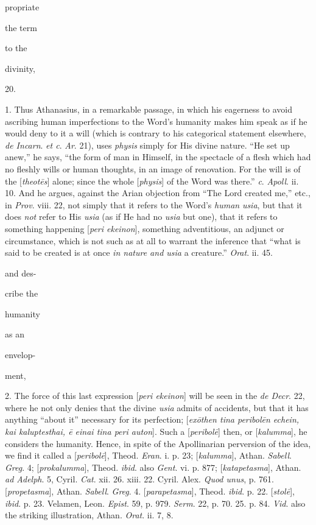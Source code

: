 propriate

the term

to the

divinity,

20.

1. Thus Athanasius,
in a remarkable passage, in which his eagerness to avoid
ascribing human imperfections to the Word's humanity makes him
speak as if he would deny to it a will (which is contrary to
his categorical statement elsewhere, \emph{de Incarn}. \emph{et c}.
\emph{Ar}. 21), uses \emph{physis} simply for His divine
nature. ``He set up anew,'' he says, ``the form of man in
Himself, in the spectacle of a flesh which had no
fleshly wills or human thoughts, in an image of renovation.
For the will is of the [\emph{theot\={e}s}] alone; since
the whole [\emph{physis}] of the Word was there.'' \emph{c}. \emph{Apoll}.
ii. 10. And he argues, against the Arian objection from ``The
Lord created me,'' etc., in \emph{Prov}. viii. 22, not simply
that it refers to the Word's \emph{human} \emph{usia}, but
that it does \emph{not} refer to His \emph{usia} (as if He had no \emph{usia}
but one), that it refers to something happening [\emph{peri
ekeinon}], something adventitious, an adjunct or
circumstance, which is not such as at all to warrant the
inference that ``what is said to be created is at once \emph{in
nature and usia} a creature.'' \emph{Orat}. ii. 45.

and des-

cribe the

humanity

as an

envelop-

ment,

2. The force of this
last expression [\emph{peri ekeinon}] will be seen in the \emph{de
Decr}. 22, where he not only denies that the divine \emph{usia}
admits of accidents, but that it has anything ``about it''
necessary for its perfection; [\emph{ex\={o}then tina peribol\={e}n
echein, kai kaluptesthai, \={e} einai tina peri auton}].
Such a [\emph{peribol\={e}}] then, or [\emph{kalumma}], he
considers the humanity. Hence, in spite of the Apollinarian
perversion of the idea, we find it called a [\emph{peribol\={e}}],
Theod. \emph{Eran}. i. p. 23; [\emph{kalumma}], Athan. \emph{Sabell}.
\emph{Greg}. 4; [\emph{prokalumma}], Theod. \emph{ibid}. also \emph{Gent}.
vi. p. 877; [\emph{katapetasma}], Athan. \emph{ad Adelph}. 5,
Cyril. \emph{Cat}. xii. 26. xiii. 22. Cyril. Alex. \emph{Quod
unus}, p. 761. [\emph{propetasma}], Athan. \emph{Sabell}. \emph{Greg}.
4. [\emph{parapetasma}], Theod. \emph{ibid}. p. 22. [\emph{stol\={e}}],
\emph{ibid}. p. 23. Velamen, Leon. \emph{Epist}. 59, p. 979. \emph{Serm}.
22, p. 70. 25. p. 84. \emph{Vid}. also the striking
illustration, Athan. \emph{Orat}. ii. 7, 8.

